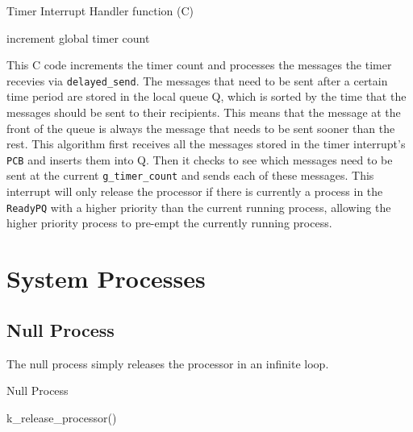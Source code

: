 \documentclass[12pt]{report}
\begin{document}
\begin{algorithm}[H]
	\caption{Timer Interrupt Handler function (C)}
	\begin{algorithmic}[1]
	    \State increment global timer count
			\EndIf
		\EndWhile
		\EndWhile
		\EndIf
	  \EndFunction
	\end{algorithmic}
\end{algorithm}

This C code increments the timer count and processes the messages the timer recevies via \texttt{delayed\_send}.  The messages that need to be sent after a certain time period are stored in the local queue Q, which is sorted by the time that the messages should be sent to their recipients.  This means that the message at the front of the queue is always the message that needs to be sent sooner than the rest.  This algorithm first receives all the messages stored in the timer interrupt's \texttt{PCB} and inserts them into Q.  Then it checks to see which messages need to be sent at the current \texttt{g_timer_count} and sends each of these messages.  This interrupt will only release the processor if there is currently a process in the \texttt{ReadyPQ} with a higher priority than the current running process, allowing the higher priority process to pre-empt the currently running process.


\section{System Processes}

\subsection{Null Process}

The null process simply releases the processor in an infinite loop.

\begin{algorithm}[H]
	\caption{Null Process}
	\begin{algorithmic}[1]
				\State k_release_processor()
			\EndWhile
		\EndFunction		
	\end{algorithmic}
\end{algorithm}
\end{document}
